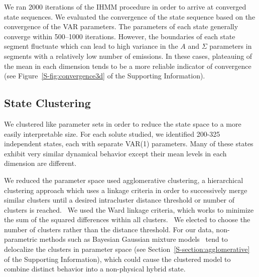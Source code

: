 \documentclass[journal=jpcbfk,manuscript=article]{achemso}
\begin{document}
  We ran 2000 iterations of the IHMM procedure in order to arrive at converged 
  state sequences. We evaluated the convergence of the state sequence based on
  the convergence of the VAR parameters. The parameters of each state
  generally converge within 500--1000 iterations. However, the boundaries of 
  each state segment fluctuate which can lead to high variance in the $A$
  and $\Sigma$ parameters in segments with a relatively low number of emissions.
  In these cases, plateauing of the mean in each dimension tends to be a more 
  reliable indicator of convergence (see Figure~\ref{S-fig:convergence3d} of
  the Supporting Information).
  
  
  \subsection{State Clustering}\label{method:clustering}  

  We clustered like parameter sets in order to reduce the state space to
  a more easily interpretable size. For each solute studied, we identified 200-325
  independent states, each with separate VAR(1) parameters. Many of these states
  exhibit very similar dynamical behavior except their mean levels in each dimension
  are different.
  
  We reduced the parameter space used agglomerative clustering, a hierarchical
  clustering approach which uses a linkage criteria in order to successively merge
  similar clusters until a desired intracluster distance threshold or number of
  clusters is reached.~\cite{pedregosa_scikit-learn_2011} We used the Ward linkage 
  criteria, which works to minimize the sum of the squared differences within all
  clusters.~\cite{ward_hierarchical_1963} We elected to choose the number of clusters
  rather than the distance threshold. For our data, non-parametric methods such as 
  Bayesian Gaussian mixture models~\cite{pedregosa_scikit-learn_2011,gelman_bayesian_2013}
  tend to delocalize the clusters in parameter space (see Section~\ref{S-section:agglomerative}
  of the Supporting Information), which could cause the clustered model to combine 
  distinct behavior into a non-physical hybrid state.
\end{document}
